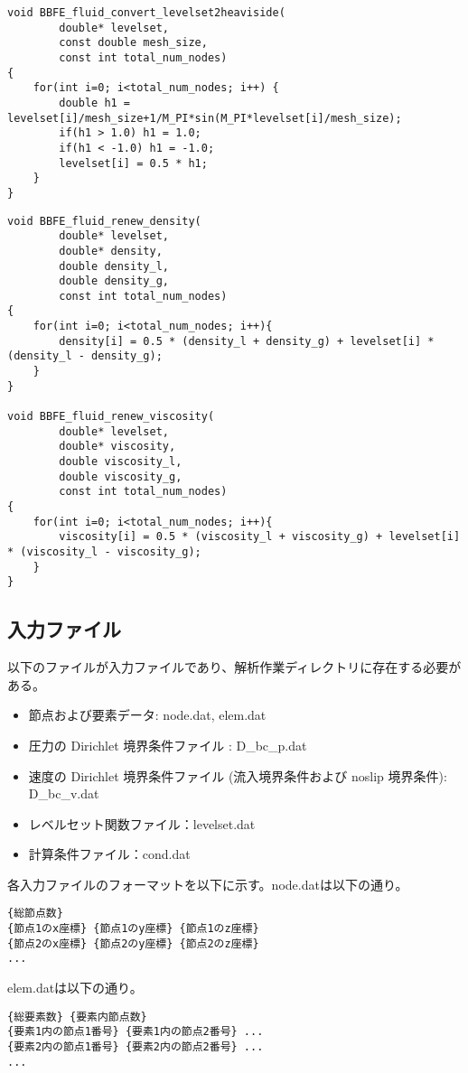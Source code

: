 \begin{lstlisting}[caption = mlflow\_core.cのレベルセット関数の近似Heaviside関数による平滑化計算]
void BBFE_fluid_convert_levelset2heaviside(
		double* levelset,
		const double mesh_size,
		const int total_num_nodes)
{
	for(int i=0; i<total_num_nodes; i++) {
		double h1 = levelset[i]/mesh_size+1/M_PI*sin(M_PI*levelset[i]/mesh_size);
		if(h1 > 1.0) h1 = 1.0;
		if(h1 < -1.0) h1 = -1.0;
		levelset[i] = 0.5 * h1;
	}
}
\end{lstlisting}

\begin{lstlisting}[caption = mlflow\_core.cの密度と粘性の計算]
void BBFE_fluid_renew_density(
		double* levelset,
		double* density,
		double density_l,
		double density_g,
		const int total_num_nodes)
{
	for(int i=0; i<total_num_nodes; i++){
		density[i] = 0.5 * (density_l + density_g) + levelset[i] * (density_l - density_g);
	}
}

void BBFE_fluid_renew_viscosity(
		double* levelset,
		double* viscosity,
		double viscosity_l,
		double viscosity_g,
		const int total_num_nodes)
{
	for(int i=0; i<total_num_nodes; i++){
		viscosity[i] = 0.5 * (viscosity_l + viscosity_g) + levelset[i] * (viscosity_l - viscosity_g);
	}
}
\end{lstlisting}

\subsection{入力ファイル}
以下のファイルが入力ファイルであり、解析作業ディレクトリに存在する必要がある。
\begin{itemize}
	\item 節点および要素データ: node.dat, elem.dat
	\item 圧力の Dirichlet 境界条件ファイル : D\_bc\_p.dat
	\item 速度の Dirichlet 境界条件ファイル (流入境界条件および noslip 境界条件): D\_bc\_v.dat
	\item レベルセット関数ファイル：levelset.dat
	\item 計算条件ファイル：cond.dat
\end{itemize}

各入力ファイルのフォーマットを以下に示す。node.datは以下の通り。
\begin{lstlisting}[]
{総節点数}
{節点1のx座標} {節点1のy座標} {節点1のz座標}
{節点2のx座標} {節点2のy座標} {節点2のz座標}
...
\end{lstlisting}

elem.datは以下の通り。
\begin{lstlisting}[]
{総要素数} {要素内節点数}
{要素1内の節点1番号} {要素1内の節点2番号} ...
{要素2内の節点1番号} {要素2内の節点2番号} ...
...
\end{lstlisting}

